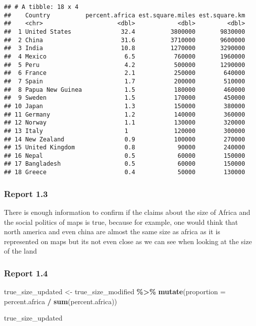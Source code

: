 \documentclass[
]{article}
\newenvironment{Shaded}{\begin{snugshade}}{\end{snugshade}}
\newcommand{\AttributeTok}[1]{\textcolor[rgb]{0.13,0.29,0.53}{#1}}
\newcommand{\FunctionTok}[1]{\textcolor[rgb]{0.13,0.29,0.53}{\textbf{#1}}}
\newcommand{\NormalTok}[1]{#1}
\newcommand{\OtherTok}[1]{\textcolor[rgb]{0.56,0.35,0.01}{#1}}
\newcommand{\SpecialCharTok}[1]{\textcolor[rgb]{0.81,0.36,0.00}{\textbf{#1}}}
\begin{document}
\begin{verbatim}
## # A tibble: 18 x 4
##    Country          percent.africa est.square.miles est.square.km
##    <chr>                     <dbl>            <dbl>         <dbl>
##  1 United States              32.4          3800000       9830000
##  2 China                      31.6          3710000       9600000
##  3 India                      10.8          1270000       3290000
##  4 Mexico                      6.5           760000       1960000
##  5 Peru                        4.2           500000       1290000
##  6 France                      2.1           250000        640000
##  7 Spain                       1.7           200000        510000
##  8 Papua New Guinea            1.5           180000        460000
##  9 Sweden                      1.5           170000        450000
## 10 Japan                       1.3           150000        380000
## 11 Germany                     1.2           140000        360000
## 12 Norway                      1.1           130000        320000
## 13 Italy                       1             120000        300000
## 14 New Zealand                 0.9           100000        270000
## 15 United Kingdom              0.8            90000        240000
## 16 Nepal                       0.5            60000        150000
## 17 Bangladesh                  0.5            60000        150000
## 18 Greece                      0.4            50000        130000
\end{verbatim}

\subsubsection{Report 1.3}\label{report-1.3}

There is enough information to confirm if the claims about the size of
Africa and the social politics of maps is true, because for example, one
would think that north america and even china are almost the same size
as africa as it is represented on maps but its not even close as we can
see when looking at the size of the land

\subsubsection{Report 1.4}\label{report-1.4}

\begin{Shaded}
\begin{Highlighting}[]
\NormalTok{true\_size\_updated }\OtherTok{\textless{}{-}}\NormalTok{ true\_size\_modified }\SpecialCharTok{\%\textgreater{}\%}
    \FunctionTok{mutate}\NormalTok{(}\AttributeTok{proportion =}\NormalTok{ percent.africa }\SpecialCharTok{/} \FunctionTok{sum}\NormalTok{(percent.africa))}

\NormalTok{true\_size\_updated}
\end{Highlighting}
\end{Shaded}
\end{document}
